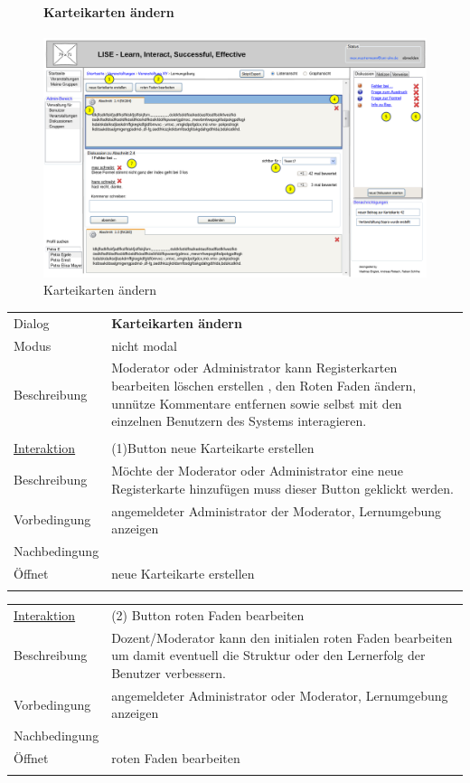 \documentclass[12pt,a4paper]{article}
\begin{document}
{\begin{figure}[H]
	\paragraph{Karteikarten ändern}
	\includegraphics[width=\textwidth]{Bilder/Mockups/GUI/KarteikartenAendern[ModeratorAdmin].png}
	\caption{Karteikarten ändern}
	\label{GuiKarteikartenAendern}
\end{figure}

\begin{tabular}{l p{12cm}}
Dialog 	 		 & \textbf{Karteikarten ändern} \\ 
Modus 			 & nicht modal\\ 
Beschreibung   	 & Moderator oder Administrator kann Registerkarten bearbeiten löschen erstellen , den Roten Faden ändern, unnütze Kommentare entfernen sowie  selbst mit den einzelnen Benutzern des Systems interagieren.\\\\

\underline{Interaktion} & (1)Button neue Karteikarte erstellen \\ 
Beschreibung   	 		& Möchte der Moderator oder Administrator eine neue Registerkarte hinzufügen muss dieser Button geklickt werden.\\
Vorbedingung	 		& angemeldeter Administrator der Moderator, Lernumgebung anzeigen\\
Nachbedingung	 		& \\
Öffnet			 		& \glqq neue Karteikarte erstellen \grqq \\\\
\end{tabular}

\begin{tabular}{l p{12cm}}
\underline{Interaktion} & (2)   Button roten Faden bearbeiten\\ 
Beschreibung   	 		& Dozent/Moderator kann den initialen roten Faden bearbeiten um damit eventuell die Struktur oder den Lernerfolg der Benutzer verbessern. \\
Vorbedingung	 		& angemeldeter Administrator oder Moderator, Lernumgebung anzeigen\\
Nachbedingung	 		& \\
Öffnet			 		& \glqq roten Faden bearbeiten\grqq \\\\
\end{tabular}

}
\end{document}
